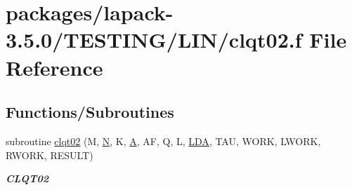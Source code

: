 \hypertarget{clqt02_8f}{}\section{packages/lapack-\/3.5.0/\+T\+E\+S\+T\+I\+N\+G/\+L\+I\+N/clqt02.f File Reference}
\label{clqt02_8f}
\subsection*{Functions/\+Subroutines}
\begin{DoxyCompactItemize}
\item 
subroutine \hyperlink{group__complex__lin_ga51159190e05633c4ab1b81ccfbdb6597}{clqt02} (M, \hyperlink{polmisc_8c_a0240ac851181b84ac374872dc5434ee4}{N}, K, \hyperlink{classA}{A}, A\+F, Q, L, \hyperlink{example__user_8c_ae946da542ce0db94dced19b2ecefd1aa}{L\+D\+A}, T\+A\+U, W\+O\+R\+K, L\+W\+O\+R\+K, R\+W\+O\+R\+K, R\+E\+S\+U\+L\+T)
\begin{DoxyCompactList}\small\item\em {\bfseries C\+L\+Q\+T02} \end{DoxyCompactList}\end{DoxyCompactItemize}
